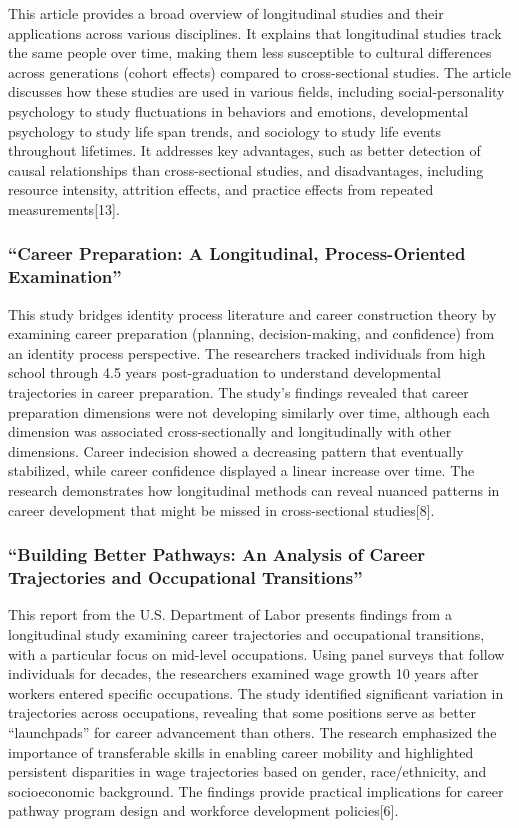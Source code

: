 \documentclass[
  letterpaper,
  DIV=11,
  numbers=noendperiod]{scrartcl}
\begin{document}
This article provides a broad overview of longitudinal studies and their
applications across various disciplines. It explains that longitudinal
studies track the same people over time, making them less susceptible to
cultural differences across generations (cohort effects) compared to
cross-sectional studies. The article discusses how these studies are
used in various fields, including social-personality psychology to study
fluctuations in behaviors and emotions, developmental psychology to
study life span trends, and sociology to study life events throughout
lifetimes. It addresses key advantages, such as better detection of
causal relationships than cross-sectional studies, and disadvantages,
including resource intensity, attrition effects, and practice effects
from repeated measurements{[}13{]}.

\subsubsection{``Career Preparation: A Longitudinal, Process-Oriented
Examination''}\label{career-preparation-a-longitudinal-process-oriented-examination}

This study bridges identity process literature and career construction
theory by examining career preparation (planning, decision-making, and
confidence) from an identity process perspective. The researchers
tracked individuals from high school through 4.5 years post-graduation
to understand developmental trajectories in career preparation. The
study's findings revealed that career preparation dimensions were not
developing similarly over time, although each dimension was associated
cross-sectionally and longitudinally with other dimensions. Career
indecision showed a decreasing pattern that eventually stabilized, while
career confidence displayed a linear increase over time. The research
demonstrates how longitudinal methods can reveal nuanced patterns in
career development that might be missed in cross-sectional
studies{[}8{]}.

\subsubsection{``Building Better Pathways: An Analysis of Career
Trajectories and Occupational
Transitions''}\label{building-better-pathways-an-analysis-of-career-trajectories-and-occupational-transitions}

This report from the U.S. Department of Labor presents findings from a
longitudinal study examining career trajectories and occupational
transitions, with a particular focus on mid-level occupations. Using
panel surveys that follow individuals for decades, the researchers
examined wage growth 10 years after workers entered specific
occupations. The study identified significant variation in trajectories
across occupations, revealing that some positions serve as better
``launchpads'' for career advancement than others. The research
emphasized the importance of transferable skills in enabling career
mobility and highlighted persistent disparities in wage trajectories
based on gender, race/ethnicity, and socioeconomic background. The
findings provide practical implications for career pathway program
design and workforce development policies{[}6{]}.
\end{document}
